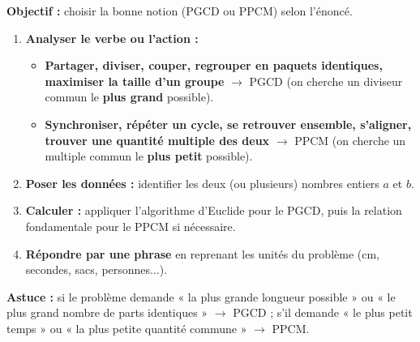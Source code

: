 \documentclass[11pt]{article}
\newcommand{\cle}[1]{{\popxbold\color{popdark}#1}}
\begin{document}
\begin{methode}
\textbf{Objectif :} choisir la bonne notion (PGCD ou PPCM) selon l'énoncé.
\begin{enumerate}
    \item \textbf{Analyser le verbe ou l'action :}
    \begin{itemize}
        \item \textbf{Partager, diviser, couper, regrouper en paquets identiques, maximiser la taille d'un groupe} $\rightarrow$ \cle{PGCD} (on cherche un diviseur commun le \textbf{plus grand} possible).
        \item \textbf{Synchroniser, répéter un cycle, se retrouver ensemble, s'aligner, trouver une quantité multiple des deux} $\rightarrow$ \cle{PPCM} (on cherche un multiple commun le \textbf{plus petit} possible).
    \end{itemize}
    \item \textbf{Poser les données :} identifier les deux (ou plusieurs) nombres entiers $a$ et $b$.
    \item \textbf{Calculer :} appliquer l'algorithme d'Euclide pour le PGCD, puis la relation fondamentale pour le PPCM si nécessaire.
    \item \textbf{Répondre par une phrase} en reprenant les unités du problème (cm, secondes, sacs, personnes...).
\end{enumerate}
\textbf{Astuce :} si le problème demande « la plus grande longueur possible » ou « le plus grand nombre de parts identiques » $\rightarrow$ PGCD ; s'il demande « le plus petit temps » ou « la plus petite quantité commune » $\rightarrow$ PPCM.
\end{methode}
\end{document}
